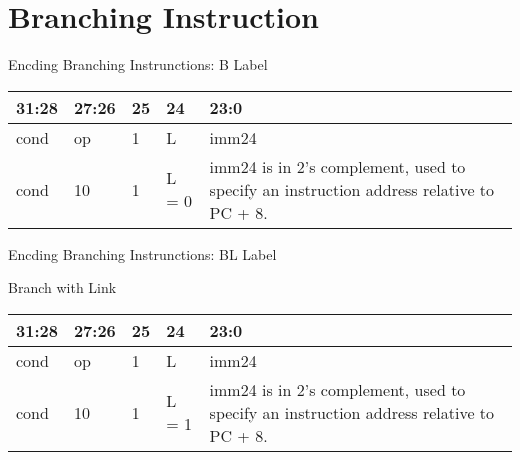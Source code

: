 \documentclass[aspectratio=169]{beamer}
\begin{document}
    \section{Branching Instruction}

\begin{frame}
    \sectionpage
\end{frame}


\begin{frame}{Encding Branching Instrunctions: B Label}

    \begin{center}
        \renewcommand{\arraystretch}{1.2}
        \begin{tabular}{|p{4.0em}|p{4.0em}|p{3.5em}|p{4.5em}|p{12.0em}|}
        \hline
        31:28 & 27:26 & 25 & 24 & 23:0\\
        \hline
        cond & op & 1 & L & imm24 \\
        \hline
        cond & 10 & 1 & L = 0 & imm24  is in 2’s complement, used to specify an instruction
        address relative to PC + 8.\\
        \hline
        \end{tabular}
    \end{center}

\end{frame}

\begin{frame}{Encding Branching Instrunctions: BL Label}

    Branch with Link

    \begin{center}
        \renewcommand{\arraystretch}{1.2}
        \begin{tabular}{|p{4.0em}|p{4.0em}|p{3.5em}|p{4.5em}|p{12.0em}|}
        \hline
        31:28 & 27:26 & 25 & 24 & 23:0\\
        \hline
        cond & op & 1 & L & imm24 \\
        \hline
        cond & 10 & 1 & L = 1 & imm24  is in 2’s complement, used to specify an instruction
        address relative to PC + 8.\\
        \hline
        \end{tabular}
    \end{center}

\end{frame}
\end{document}

